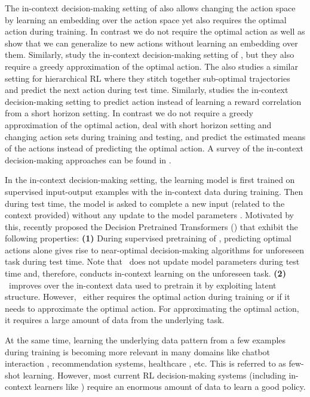 The in-context decision-making setting of \citet{sinii2023context} also allows changing the action space by learning an embedding over the action space yet also requires the optimal action during training. In contrast we do not require the optimal action as well as show that we can generalize to new actions without learning an embedding over them. Similarly, \citet{lin2023transformers} study the in-context decision-making setting of \citet{laskin2022context, lee2023supervised}, but they also require a greedy approximation of the optimal action. The \citet{ma2023rethinking} also studies a similar setting for hierarchical RL where they stitch together sub-optimal trajectories and predict the next action during test time. Similarly, \citet{liu2023reason} studies the in-context decision-making setting to predict action instead of learning a reward correlation from a short horizon setting.
%
In contrast we do not require a greedy approximation of the optimal action, deal with short horizon setting and changing action sets during training and testing, and predict the estimated means of the actions instead of predicting the optimal action.
%
A survey of the in-context decision-making approaches can be found in \citet{liu2023self}.

%
In the in-context decision-making setting, the learning model is first trained on supervised input-output examples with the in-context data during training. Then during test time, the model is asked to complete a new input (related to the context provided) without any update to the model parameters \citep{xie2021explanation, min2022rethinking}. Motivated by this, \citet{lee2023supervised} recently proposed the Decision Pretrained Transformers (\dpt) that exhibit the following properties: \textbf{(1)} During supervised pretraining of \dpt, predicting optimal actions alone gives rise to near-optimal decision-making algorithms for unforeseen task during test time. Note that \dpt\ does not update model parameters during test time and, therefore, conducts in-context learning on the unforeseen task. \textbf{(2)} \dpt\ improves over the in-context data used to pretrain it by exploiting latent structure. However, \dpt\ either requires the optimal action during training or if it needs to approximate the optimal action. For approximating the optimal action, it requires a large amount of data from the underlying task.




At the same time, learning the underlying data pattern from a few examples during training is becoming more relevant in many domains like chatbot interaction \citep{madotto2021few,semnani2023wikichat}, recommendation systems, healthcare \citep{ge2022few, liu2023large}, etc. This is referred to as few-shot learning.
%
However, most current RL decision-making systems (including in-context learners like \dpt) require an enormous amount of data to learn a good policy.



